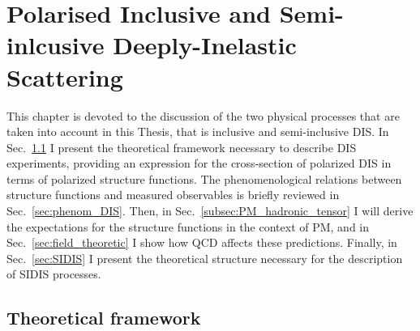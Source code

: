 \chapter{Polarised Inclusive and Semi-inlcusive Deeply-Inelastic Scattering}
\label{ch:2}

This chapter is devoted to the discussion of the two physical processes that are taken into account in this Thesis, that is inclusive and semi-inclusive DIS. In Sec.~\ref{sec:theo_fram} I present the theoretical framework necessary to describe DIS experiments, providing an expression for the cross-section of polarized DIS in terms of polarized structure functions. The phenomenological relations between structure functions and measured observables is briefly reviewed in Sec.~\ref{sec:phenom_DIS}. Then, in Sec.~\ref{subsec:PM_hadronic_tensor} I will derive the expectations for the structure functions in the context of PM, and in Sec.~\ref{sec:field_theoretic} I show how QCD affects these predictions. Finally, in Sec.~\ref{sec:SIDIS} I present the theoretical structure necessary for the description of SIDIS processes.

\section{Theoretical framework}
\label{sec:theo_fram}

